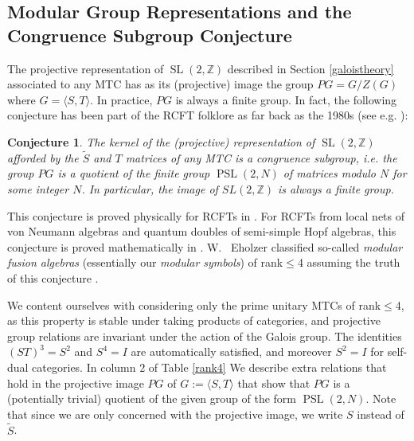 \documentclass[12pt,psamsfonts]{amsart}
\newcommand{\lan}{\langle}
\newcommand{\ra}{\rangle}
\DeclareMathOperator{\SL}{SL}\DeclareMathOperator{\SU}{SU}\DeclareMathOperator{\PSL}{PSL}
\newcommand{\Z}{\mathbb Z}
\newcommand{\tS}{\tilde{S}}
\numberwithin{equation}{section}
\newtheorem{conj}[theorem]{Conjecture}
\theoremstyle{definition}
\begin{document}
\subsection{Modular Group Representations and the Congruence Subgroup Conjecture}

The projective representation of $\SL(2,\Z)$
described in Section \ref{galoistheory} associated to any MTC has as its (projective) image
the group $PG=G/Z(G)$ where $G=\lan S,T\ra$.  In practice, $PG$ is always a finite group.  In
fact, the following conjecture has been part of the RCFT folklore as far back
as the 1980s (see e.g. \cite{Mo}):
\begin{conj}
The kernel of the (projective) representation of $\SL(2,\Z)$ afforded by the $\tS$ and $T$ matrices of any MTC is
a congruence subgroup, \emph{i.e.} the group $PG$ is a quotient of the finite group $\PSL(2,N)$ of matrices modulo $N$ for some integer $N$.
  In particular, the image of $SL(2,\Z)$ is always a finite group.
\end{conj}

This conjecture is proved physically for RCFTs in \cite{Bantay1}.
For RCFTs from local nets of von Neumann algebras and quantum
doubles of semi-simple Hopf algebras, this conjecture is proved
mathematically in \cite{Xu} \cite{SZ}. W.~ Eholzer classified
so-called \textit{modular fusion algebras} (essentially our
\emph{modular symbols}) of rank$\leq$4 assuming the truth of this
conjecture \cite{Eh}.

We content ourselves with considering only the prime unitary MTCs
of rank$\leq$4, as this property is stable under taking products
of categories, and projective group relations are invariant under
the action of the Galois group.  The identities $(S T)^3=S^2$ and
$S^4=I$ are automatically satisfied, and moreover $S^2=I$ for
self-dual categories.  In column $2$ of Table \ref{rank4} We
describe extra relations that hold in the projective image $PG$ of
$G:=\lan S,T\ra$ that show that $PG$ is a (potentially trivial)
quotient of the given group of the form $\PSL(2,N)$.  Note that
since we are only concerned with the projective image, we write
$S$ instead of $\tS$.
\fi
\end{document}
